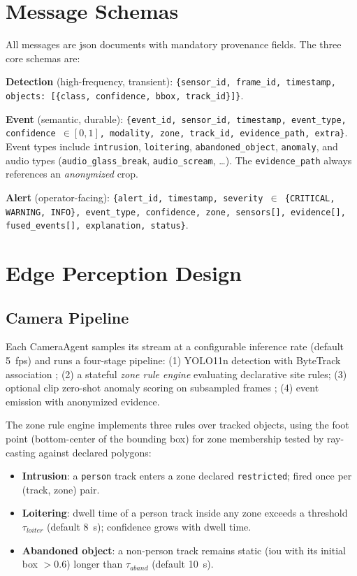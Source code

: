 \section{Message Schemas}

All messages are \gls{json} documents with mandatory provenance fields. The three core schemas are:

\textbf{Detection} (high-frequency, transient): \texttt{\{sensor\_id, frame\_id, timestamp, objects: [\{class, confidence, bbox, track\_id\}]\}}.

\textbf{Event} (semantic, durable): \texttt{\{event\_id, sensor\_id, timestamp, event\_type, confidence $\in [0,1]$, modality, zone, track\_id, evidence\_path, extra\}}. Event types include \texttt{intrusion}, \texttt{loitering}, \texttt{abandoned\_object}, \texttt{anomaly}, and audio types (\texttt{audio\_glass\_break}, \texttt{audio\_scream}, \ldots). The \texttt{evidence\_path} always references an \emph{anonymized} crop.

\textbf{Alert} (operator-facing): \texttt{\{alert\_id, timestamp, severity $\in$ \{CRITICAL, WARNING, INFO\}, event\_type, confidence, zone, sensors[], evidence[], fused\_events[], explanation, status\}}.

\section{Edge Perception Design}

\subsection{Camera Pipeline}

Each CameraAgent samples its stream at a configurable inference rate (default 5~\gls{fps}) and runs a four-stage pipeline: (1) YOLO11n detection with ByteTrack association \cite{ultralytics2025yolov8, zhang2022bytetrack}; (2) a stateful \emph{zone rule engine} evaluating declarative site rules; (3) optional \gls{clip} zero-shot anomaly scoring on subsampled frames \cite{radford2021clip}; (4) event emission with anonymized evidence.

The zone rule engine implements three rules over tracked objects, using the foot point (bottom-center of the bounding box) for zone membership tested by ray-casting against declared polygons:

\begin{itemize}
    \item \textbf{Intrusion}: a \texttt{person} track enters a zone declared \texttt{restricted}; fired once per (track, zone) pair.
    \item \textbf{Loitering}: dwell time of a person track inside any zone exceeds a threshold $\tau_{loiter}$ (default 8~s); confidence grows with dwell time.
    \item \textbf{Abandoned object}: a non-person track remains static (\gls{iou} with its initial box $> 0.6$) longer than $\tau_{aband}$ (default 10~s).
\end{itemize}

